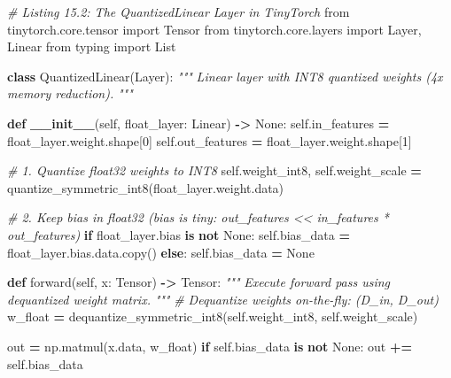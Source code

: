 \documentclass[
  letterpaper,
]{scrbook}
\newenvironment{Shaded}{\begin{snugshade}}{\end{snugshade}}
\newcommand{\CommentTok}[1]{\textcolor[rgb]{0.56,0.35,0.01}{\textit{#1}}}
\newcommand{\ControlFlowTok}[1]{\textcolor[rgb]{0.13,0.29,0.53}{\textbf{#1}}}
\newcommand{\DecValTok}[1]{\textcolor[rgb]{0.00,0.00,0.81}{#1}}
\newcommand{\FunctionTok}[1]{\textcolor[rgb]{0.13,0.29,0.53}{\textbf{#1}}}
\newcommand{\ImportTok}[1]{#1}
\newcommand{\KeywordTok}[1]{\textcolor[rgb]{0.13,0.29,0.53}{\textbf{#1}}}
\newcommand{\NormalTok}[1]{#1}
\newcommand{\OperatorTok}[1]{\textcolor[rgb]{0.81,0.36,0.00}{\textbf{#1}}}
\newcommand{\VariableTok}[1]{\textcolor[rgb]{0.00,0.00,0.00}{#1}}
\begin{document}
\begin{Shaded}
\begin{Highlighting}[]
\CommentTok{\# Listing 15.2: The QuantizedLinear Layer in TinyTorch}
\ImportTok{from}\NormalTok{ tinytorch.core.tensor }\ImportTok{import}\NormalTok{ Tensor}
\ImportTok{from}\NormalTok{ tinytorch.core.layers }\ImportTok{import}\NormalTok{ Layer, Linear}
\ImportTok{from}\NormalTok{ typing }\ImportTok{import}\NormalTok{ List}

\KeywordTok{class}\NormalTok{ QuantizedLinear(Layer):}
    \CommentTok{"""}
\CommentTok{    Linear layer with INT8 quantized weights (4x memory reduction).}
\CommentTok{    """}

    \KeywordTok{def} \FunctionTok{\_\_init\_\_}\NormalTok{(}\VariableTok{self}\NormalTok{, float\_layer: Linear) }\OperatorTok{{-}\textgreater{}} \VariableTok{None}\NormalTok{:}
        \VariableTok{self}\NormalTok{.in\_features }\OperatorTok{=}\NormalTok{ float\_layer.weight.shape[}\DecValTok{0}\NormalTok{]}
        \VariableTok{self}\NormalTok{.out\_features }\OperatorTok{=}\NormalTok{ float\_layer.weight.shape[}\DecValTok{1}\NormalTok{]}

        \CommentTok{\# 1. Quantize float32 weights to INT8}
        \VariableTok{self}\NormalTok{.weight\_int8, }\VariableTok{self}\NormalTok{.weight\_scale }\OperatorTok{=}\NormalTok{ quantize\_symmetric\_int8(float\_layer.weight.data)}

        \CommentTok{\# 2. Keep bias in float32 (bias is tiny: out\_features \textless{}\textless{} in\_features * out\_features)}
        \ControlFlowTok{if}\NormalTok{ float\_layer.bias }\KeywordTok{is} \KeywordTok{not} \VariableTok{None}\NormalTok{:}
            \VariableTok{self}\NormalTok{.bias\_data }\OperatorTok{=}\NormalTok{ float\_layer.bias.data.copy()}
        \ControlFlowTok{else}\NormalTok{:}
            \VariableTok{self}\NormalTok{.bias\_data }\OperatorTok{=} \VariableTok{None}

    \KeywordTok{def}\NormalTok{ forward(}\VariableTok{self}\NormalTok{, x: Tensor) }\OperatorTok{{-}\textgreater{}}\NormalTok{ Tensor:}
        \CommentTok{"""}
\CommentTok{        Execute forward pass using dequantized weight matrix.}
\CommentTok{        """}
        \CommentTok{\# Dequantize weights on{-}the{-}fly: (D\_in, D\_out)}
\NormalTok{        w\_float }\OperatorTok{=}\NormalTok{ dequantize\_symmetric\_int8(}\VariableTok{self}\NormalTok{.weight\_int8, }\VariableTok{self}\NormalTok{.weight\_scale)}

\NormalTok{        out }\OperatorTok{=}\NormalTok{ np.matmul(x.data, w\_float)}
        \ControlFlowTok{if} \VariableTok{self}\NormalTok{.bias\_data }\KeywordTok{is} \KeywordTok{not} \VariableTok{None}\NormalTok{:}
\NormalTok{            out }\OperatorTok{+=} \VariableTok{self}\NormalTok{.bias\_data}


\end{Highlighting}
\end{Shaded}
\end{document}
